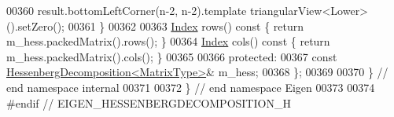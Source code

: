 \begin{DoxyCode}
00360         result.bottomLeftCorner(n-2, n-2).template triangularView<Lower>().setZero();
00361     \}
00362 
00363     \hyperlink{namespace_eigen_a62e77e0933482dafde8fe197d9a2cfde}{Index} rows()\textcolor{keyword}{ const }\{ \textcolor{keywordflow}{return} m\_hess.packedMatrix().rows(); \}
00364     \hyperlink{namespace_eigen_a62e77e0933482dafde8fe197d9a2cfde}{Index} cols()\textcolor{keyword}{ const }\{ \textcolor{keywordflow}{return} m\_hess.packedMatrix().cols(); \}
00365 
00366   \textcolor{keyword}{protected}:
00367     \textcolor{keyword}{const} \hyperlink{group___eigenvalues___module}{HessenbergDecomposition<MatrixType>}& m\_hess;
00368 \};
00369 
00370 \} \textcolor{comment}{// end namespace internal}
00371 
00372 \} \textcolor{comment}{// end namespace Eigen}
00373 
00374 \textcolor{preprocessor}{#endif // EIGEN\_HESSENBERGDECOMPOSITION\_H}
\end{DoxyCode}
